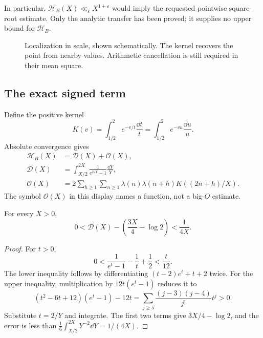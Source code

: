 In particular, \(\mathcal H_B(X)\ll_\varepsilon X^{1+\varepsilon}\)
would imply the requested pointwise square-root estimate. Only the
analytic transfer has been proved; it supplies no upper bound for
\(\mathcal H_B\).

\begin{figure}[ht]
\centering
{}
\caption{Localization in scale, shown schematically. The kernel
recovers the point from nearby values. Arithmetic cancellation is
still required in their mean square.}\label{fig:local-reconstruction}
\end{figure}

\subsection{The exact signed term}

Define the positive kernel
\[
 K(v)=\int_{1/2}^2e^{-v/t}\frac{\dd t}{t}
     =\int_{1/2}^2e^{-vu}\frac{\dd u}{u}.
\]
Absolute convergence gives
\begin{align}
 \mathcal H_B(X)&=\mathcal D(X)+\mathcal O(X),
       \label{eq:local-off-diagonal}\\
 \mathcal D(X)&=\int_{X/2}^{2X}
             \frac1{e^{2/Y}-1}\frac{\dd Y}{Y},\nonumber\\
 \mathcal O(X)&=2\sum_{h\ge1}\sum_{n\ge1}
    \lambda(n)\lambda(n+h)K((2n+h)/X).\nonumber
\end{align}
The symbol \(\mathcal O(X)\) in this display names a function,
not a big-\(O\) estimate.

\begin{proposition}\label{prop:local-diagonal}
For every \(X>0\),
\[
 0<\mathcal D(X)-\left(\frac{3X}4-\log2\right)<\frac1{4X}.
\]
\end{proposition}
\begin{proof}
For \(t>0\),
\[
 0<\frac1{e^t-1}-\frac1t+\frac12<\frac t{12}.
\]
The lower inequality follows by differentiating
\((t-2)e^t+t+2\) twice. For the upper inequality, multiplication by
\(12t(e^t-1)\) reduces it to
\[
 (t^2-6t+12)(e^t-1)-12t
   =\sum_{j\ge5}\frac{(j-3)(j-4)}{j!}t^j>0.
\]
Substitute \(t=2/Y\) and integrate. The first two terms give
\(3X/4-\log2\), and the error is less than
\(\frac16\int_{X/2}^{2X}Y^{-2}\dd Y=1/(4X)\).
\end{proof}

